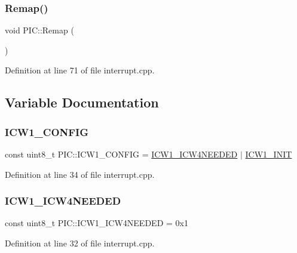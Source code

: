 \subsubsection{\texorpdfstring{Remap()}{Remap()}}
{\footnotesize\ttfamily void P\+I\+C\+::\+Remap (\begin{DoxyParamCaption}{ }\end{DoxyParamCaption})}



Definition at line 71 of file interrupt.\+cpp.



\subsection{Variable Documentation}
\mbox{\label{namespace_p_i_c_aa3b99beaed95a8a51f1e855723e05d48}} 
\subsubsection{\texorpdfstring{I\+C\+W1\+\_\+\+C\+O\+N\+F\+IG}{ICW1\_CONFIG}}
{\footnotesize\ttfamily const uint8\+\_\+t P\+I\+C\+::\+I\+C\+W1\+\_\+\+C\+O\+N\+F\+IG = \hyperlink{namespace_p_i_c_a63beb0c60fdab8c997f42291a7c2baf5}{I\+C\+W1\+\_\+\+I\+C\+W4\+N\+E\+E\+D\+ED} $\vert$ \hyperlink{namespace_p_i_c_a8bb2fc0a772eabbbf6adb002f578290e}{I\+C\+W1\+\_\+\+I\+N\+IT}}



Definition at line 34 of file interrupt.\+cpp.

\mbox{\label{namespace_p_i_c_a63beb0c60fdab8c997f42291a7c2baf5}} 
\subsubsection{\texorpdfstring{I\+C\+W1\+\_\+\+I\+C\+W4\+N\+E\+E\+D\+ED}{ICW1\_ICW4NEEDED}}
{\footnotesize\ttfamily const uint8\+\_\+t P\+I\+C\+::\+I\+C\+W1\+\_\+\+I\+C\+W4\+N\+E\+E\+D\+ED = 0x1}



Definition at line 32 of file interrupt.\+cpp.

